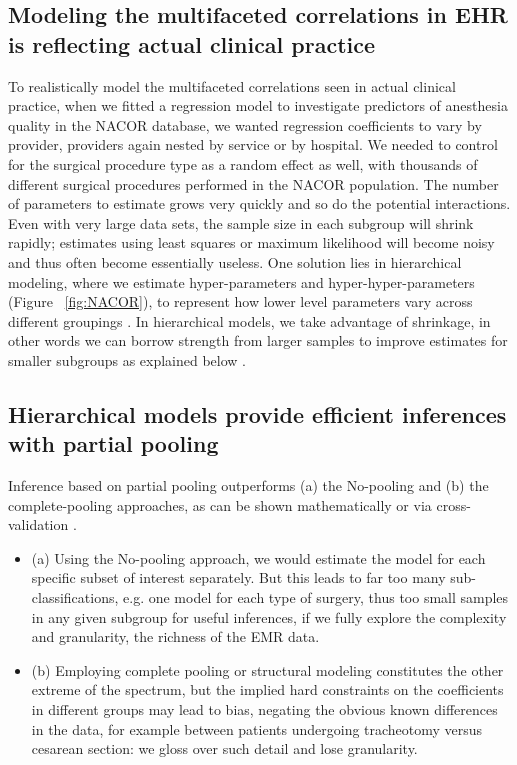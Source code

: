 \documentclass[11pt,notitlepage]{article}
\begin{document}
\subsection*{Modeling the multifaceted correlations in EHR is reflecting actual clinical practice}
To realistically model the multifaceted correlations seen in actual clinical practice, when we fitted a regression model to investigate predictors of anesthesia quality in the NACOR database, we wanted regression coefficients to vary by provider, providers again nested by service or by hospital\cite{AndreaeWhite2015}. We needed to control for the surgical procedure type as a random effect as well, with thousands of different surgical procedures performed in the NACOR population. The number of parameters to estimate grows very quickly and so do the potential interactions. Even with very large data sets, the sample size in each subgroup will shrink rapidly; estimates using least squares or maximum likelihood will become noisy and thus often become essentially useless. One solution lies in hierarchical modeling, where we estimate hyper-parameters and hyper-hyper-parameters (Figure~ \ref{fig:NACOR}), to represent how lower level parameters vary across different groupings \cite{Bafumi_Gelman_2007}. In hierarchical models, we take advantage of shrinkage, in other words we can borrow strength from larger samples to improve estimates for smaller subgroups as explained below \cite{ParkGelman2004bayesian}.

\subsection*{Hierarchical models provide efficient inferences with partial pooling}
Inference based on partial pooling outperforms (a) the No-pooling and (b) the complete-pooling approaches, as can be shown mathematically \cite{Efron_1975} or via cross-validation \cite{Gelman-Hill_2014}.  

\begin{itemize}

\item (a) Using the No-pooling approach, we would estimate the model for each specific subset of interest separately. But this leads to far too many sub-classifications, e.g. one model for each type of surgery, thus too small samples in any given subgroup for useful inferences, if we fully explore the complexity and granularity, the richness of the EMR data. 
\item (b) Employing complete pooling or structural modeling constitutes the other extreme of the spectrum, but the implied hard constraints on the coefficients in different groups may lead to bias, negating the obvious known differences in the data, for example between patients undergoing tracheotomy versus cesarean section: we gloss over such detail and lose granularity. 
\end{itemize}
\end{document}
